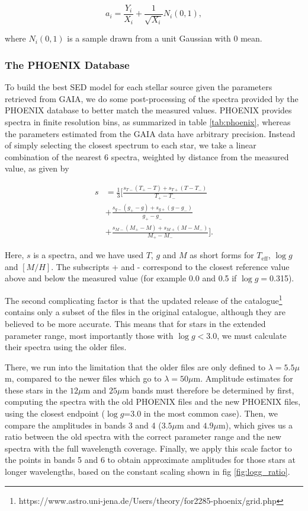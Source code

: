 \documentclass{aa}
\begin{document}
\begin{equation}
a_i = \frac{Y_i}{X_i} + \frac{1}{\sqrt{X_i}} N_i(0,1),
\end{equation}

where $N_i(0,1)$ is a sample drawn from a unit Gaussian with 0 mean.

\subsubsection{The PHOENIX Database}
\label{sec:phoenix}

To build the best SED model for each stellar source given the parameters retrieved from GAIA, we do some post-processing of the spectra provided by the PHOENIX database to better match the measured values. PHOENIX provides spectra in finite resolution bins, as summarized in table \ref{tab:phoenix}, whereas the parameters estimated from the GAIA data have arbitrary precision. Instead of simply selecting the closest spectrum to each star, we take a linear combination of the nearest 6 spectra, weighted by distance from the measured value, as given by 

\begin{align}
s &= \frac{1}{3}\bigg[\frac{s_{T-} (T_{+} - T) + s_{T+} (T - T_{-})}{T_{+} - T_{-}} \nonumber \\ 
&+ \frac{s_{g-} (g_{+} - g) + s_{g+} (g - g_{-})}{g_{+} - g_{-}} \nonumber \\
&+ \frac{s_{M-} (M_{+} - M) + s_{M+} (M - M_{-})}{M_{+} - M_{-}}\bigg].
\end{align}

Here, $s$ is a spectra, and we have used $T$, $g$ and $M$ as short forms for $T_{\mathrm{eff}}$, $\log g$ and $[M/H]$. The subscripts + and - correspond to the closest reference value above and below the measured value (for example 0.0 and 0.5 if $\log g=$0.315). 

The second complicating factor is that the updated release of the catalogue\footnote{https://www.astro.uni-jena.de/Users/theory/for2285-phoenix/grid.php} contains only a subset of the files in the original catalogue, although they are believed to be more accurate. This means that for stars in the extended parameter range, most importantly those with $\log g<$3.0, we must calculate their spectra using the older files. 

There, we run into the limitation that the older files are only defined to $\lambda=5.5\mu$m, compared to the newer files which go to $\lambda=50\mu$m. Amplitude estimates for these stars in the $12\mu$m and $25\mu$m bands must therefore be determined by first, computing the spectra with the old PHOENIX files and the new PHOENIX files, using the closest endpoint ($\log g$=3.0 in the most common case). Then, we compare the amplitudes in bands 3 and 4 ($3.5\mu$m and $4.9\mu$m), which gives us a ratio between the old spectra with the correct parameter range and the new spectra with the full wavelength coverage. Finally, we apply this scale factor to the points in bands 5 and 6 to obtain approximate amplitudes for those stars at longer wavelengths, based on the constant scaling shown in fig \ref{fig:logg_ratio}.
\end{document}
